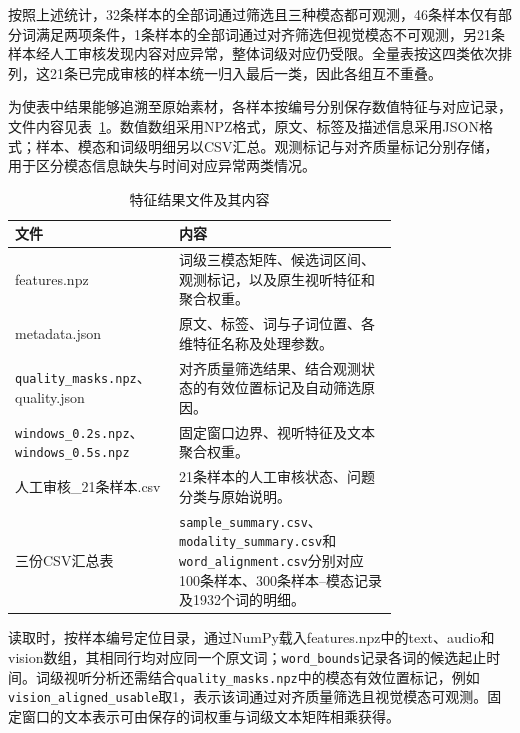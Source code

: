按照上述统计，32条样本的全部词通过筛选且三种模态都可观测，46条样本仅有部分词满足两项条件，1条样本的全部词通过对齐筛选但视觉模态不可观测，另21条样本经人工审核发现内容对应异常，整体词级对应仍受限。全量表按这四类依次排列，这21条已完成审核的样本统一归入最后一类，因此各组互不重叠。



为使表中结果能够追溯至原始素材，各样本按编号分别保存数值特征与对应记录，文件内容见表~\ref{tab:p1_files}。数值数组采用NPZ格式，原文、标签及描述信息采用JSON格式；样本、模态和词级明细另以CSV汇总。观测标记与对齐质量标记分别存储，用于区分模态信息缺失与时间对应异常两类情况。

\begin{table}[H]
    \centering\small
    \caption{特征结果文件及其内容}
    \label{tab:p1_files}
    \renewcommand{\arraystretch}{1.18}
    \begin{tabular}{@{}>{\raggedright\arraybackslash}p{0.26\linewidth}>{\raggedright\arraybackslash}p{0.50\linewidth}@{}}
        \toprule
        文件 & 内容\\ \midrule
        features.npz & 词级三模态矩阵、候选词区间、观测标记，以及原生视听特征和聚合权重。\\
        metadata.json & 原文、标签、词与子词位置、各维特征名称及处理参数。\\
        \nolinkurl{quality_masks.npz}、\newline quality.json & 对齐质量筛选结果、结合观测状态的有效位置标记及自动筛选原因。\\
        \nolinkurl{windows_0.2s.npz}、\newline\nolinkurl{windows_0.5s.npz} & 固定窗口边界、视听特征及文本聚合权重。\\
        人工审核\_21条样本.csv & 21条样本的人工审核状态、问题分类与原始说明。\\
        三份CSV汇总表 & \nolinkurl{sample_summary.csv}、\nolinkurl{modality_summary.csv}和\nolinkurl{word_alignment.csv}分别对应100条样本、300条样本--模态记录及1932个词的明细。\\
        \bottomrule
    \end{tabular}
\end{table}

读取时，按样本编号定位目录，通过NumPy载入features.npz中的text、audio和vision数组，其相同行均对应同一个原文词；\nolinkurl{word_bounds}记录各词的候选起止时间。词级视听分析还需结合\nolinkurl{quality_masks.npz}中的模态有效位置标记，例如\nolinkurl{vision_aligned_usable}取1，表示该词通过对齐质量筛选且视觉模态可观测。固定窗口的文本表示可由保存的词权重与词级文本矩阵相乘获得。

